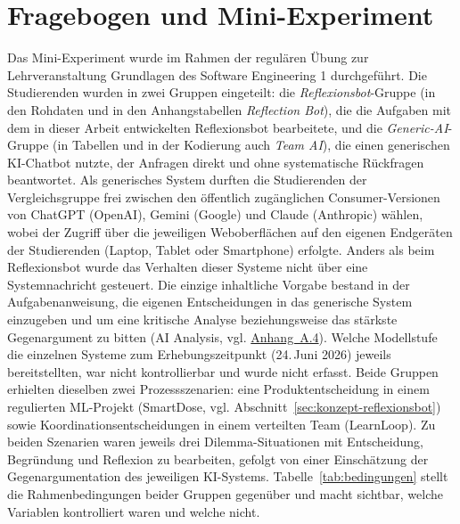 \section{Fragebogen und Mini-Experiment}
\label{sec:fragebogen-experiment}
Das Mini-Experiment wurde im Rahmen der regulären Übung zur Lehrveranstaltung \glqq Grundlagen des
Software Engineering 1\grqq{} durchgeführt. Die Studierenden wurden in zwei Gruppen eingeteilt: die
\emph{Reflexionsbot}-Gruppe (in den Rohdaten und in den Anhangstabellen \emph{Reflection Bot}), die die Aufgaben mit
dem in dieser Arbeit entwickelten Reflexionsbot bearbeitete, und die \emph{Generic-AI}-Gruppe (in
Tabellen und in der Kodierung auch \emph{Team AI}), die einen generischen KI-Chatbot nutzte, der
Anfragen direkt und ohne systematische Rückfragen beantwortet. Als generisches System durften die Studierenden der Vergleichsgruppe frei
zwischen den öffentlich zugänglichen Consumer-Versionen von ChatGPT (OpenAI), Gemini (Google) und
Claude (Anthropic) wählen, wobei der Zugriff über die jeweiligen Weboberflächen auf den eigenen
Endgeräten der Studierenden (Laptop, Tablet oder Smartphone) erfolgte. Anders als beim Reflexionsbot wurde das
Verhalten dieser Systeme nicht über eine Systemnachricht gesteuert. Die einzige inhaltliche Vorgabe
bestand in der Aufgabenanweisung, die eigenen Entscheidungen in das generische System einzugeben und
um eine kritische Analyse beziehungsweise das stärkste Gegenargument zu bitten (\glqq AI
Analysis\grqq{}, vgl. \hyperref[app:szenarien]{Anhang~A.4}). Welche Modellstufe die einzelnen Systeme zum Erhebungszeitpunkt
(24.\,Juni 2026) jeweils bereitstellten, war nicht kontrollierbar und wurde nicht erfasst. Beide
Gruppen erhielten dieselben zwei Prozessszenarien: eine Produktentscheidung in einem regulierten
ML-Projekt (\glqq SmartDose\grqq{}, vgl. Abschnitt~\ref{sec:konzept-reflexionsbot}) sowie
Koordinationsentscheidungen in einem verteilten Team (\glqq LearnLoop\grqq{}). Zu beiden Szenarien
waren jeweils drei Dilemma-Situationen mit Entscheidung, Begründung und Reflexion zu bearbeiten,
gefolgt von einer Einschätzung der Gegenargumentation des jeweiligen KI-Systems.
Tabelle~\ref{tab:bedingungen} stellt die Rahmenbedingungen beider Gruppen gegenüber und macht
sichtbar, welche Variablen kontrolliert waren und welche nicht.

